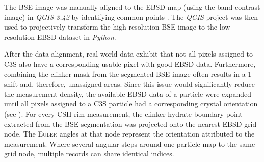 
The \ac{BSE} image was manually aligned to the \ac{EBSD} map (using the band-contrast image) in \textit{QGIS 3.42} \cite{QGIS_software} by identifying common points \cite{kleiner.2026a}.
The \textit{QGIS}-project was then used to projectively transform the high-resolution \ac{BSE} image to the low-resolution \ac{EBSD} dataset in \textit{Python}.


After the data alignment, real-world data exhibit that not all pixels assigned to \ac{C3S} also have a corresponding usable pixel with good \ac{EBSD} data.
Furthermore, combining the clinker mask from the segmented \ac{BSE} image often results in a \qty{1}{\px} shift and, therefore, unassigned areas.
Since this issue would significantly reduce the measurement density, the available \ac{EBSD} data of a particle were expanded until all pixels assigned to a \ac{C3S} particle had a corresponding crystal orientation (see ).
For every \ac{CSH} rim measurement, the clinker-hydrate boundary point extracted from the \ac{BSE} segmentation was projected onto the nearest \ac{EBSD} grid node.
The \textsc{Euler} angles at that node represent the orientation attributed to the measurement.
Where several angular steps around one particle map to the same grid node, multiple records can share identical indices. %


